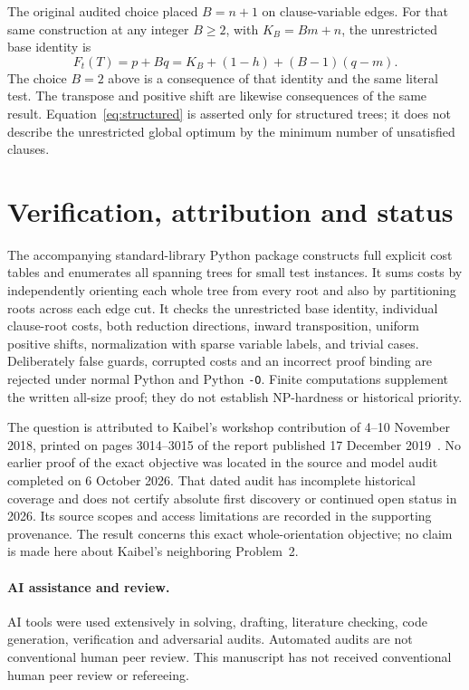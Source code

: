 \documentclass[11pt]{article}
\begin{document}
The original audited choice placed $B=n+1$ on clause-variable edges.
For that same construction at any integer $B\geq2$, with $K_B=Bm+n$,
the unrestricted base identity is
\[
 F_t(T)=p+Bq=K_B+(1-h)+(B-1)(q-m).
\]
The choice $B=2$ above is a consequence of that identity and the same
literal test. The transpose and positive shift are likewise consequences
of the same result. Equation~\eqref{eq:structured} is asserted only for
structured trees; it does not describe the unrestricted global optimum
by the minimum number of unsatisfied clauses.

\section{Verification, attribution and status}
The accompanying standard-library Python package constructs full explicit
cost tables and enumerates all spanning trees for small test instances.
It sums costs by independently orienting each whole tree from every root
and also by partitioning roots across each edge cut. It checks the
unrestricted base identity, individual clause-root costs, both reduction
directions, inward transposition, uniform positive shifts, normalization
with sparse variable labels, and trivial cases. Deliberately false guards,
corrupted costs and an incorrect proof binding are rejected under normal
Python and Python \texttt{-O}. Finite computations supplement the written
all-size proof; they do not establish NP-hardness or historical priority.

The question is attributed to Kaibel's workshop contribution of
4--10 November 2018, printed on pages 3014--3015 of the report published
17 December 2019~\cite{kaibel}. No earlier proof of the exact objective
was located in the source and model audit completed on 6 October 2026.
That dated audit has incomplete historical coverage and does not certify
absolute first discovery or continued open status in 2026. Its source
scopes and access limitations are recorded in the supporting provenance.
The result concerns this exact whole-orientation objective; no claim is
made here about Kaibel's neighboring Problem~2.

\paragraph{AI assistance and review.}
AI tools were used extensively in solving, drafting, literature checking,
code generation, verification and adversarial audits. Automated audits
are not conventional human peer review. This manuscript has not received
conventional human peer review or refereeing.
\end{document}
